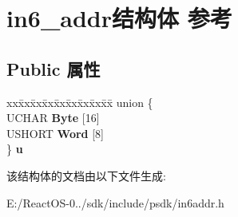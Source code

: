 \hypertarget{structin6__addr}{}\section{in6\+\_\+addr结构体 参考}
\label{structin6__addr}
\subsection*{Public 属性}
\begin{DoxyCompactItemize}
\item 
\mbox{\label{structin6__addr_a8289c5aec5cff89b6bc728368c354259}} 
\begin{tabbing}
xx\=xx\=xx\=xx\=xx\=xx\=xx\=xx\=xx\=\kill
union \{\\
\>UCHAR {\bfseries Byte} \mbox{[}16\mbox{]}\\
\>USHORT {\bfseries Word} \mbox{[}8\mbox{]}\\
\} {\bfseries u}\\

\end{tabbing}\end{DoxyCompactItemize}


该结构体的文档由以下文件生成\+:\begin{DoxyCompactItemize}
\item 
E\+:/\+React\+O\+S-\/0../sdk/include/psdk/in6addr.\+h\end{DoxyCompactItemize}
